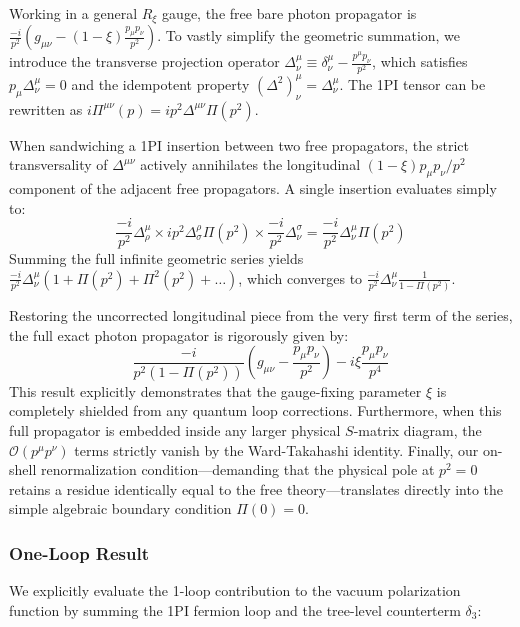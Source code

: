 Working in a general $R_\xi$ gauge, the free bare photon propagator is $\frac{-i}{p^2}\left(g_{\mu\nu} - (1-\xi)\frac{p_\mu p_\nu}{p^2}\right)$. To vastly simplify the geometric summation, we introduce the transverse projection operator $\Delta^\mu_\nu \equiv \delta^\mu_\nu - \frac{p^\mu p_\nu}{p^2}$, which satisfies $p_\mu \Delta^\mu_\nu = 0$ and the idempotent property $(\Delta^2)^\mu_\nu = \Delta^\mu_\nu$. The 1PI tensor can be rewritten as $i\Pi^{\mu\nu}(p) = i p^2 \Delta^{\mu\nu} \Pi(p^2)$.

When sandwiching a 1PI insertion between two free propagators, the strict transversality of $\Delta^{\mu\nu}$ actively annihilates the longitudinal $(1-\xi)p_\mu p_\nu/p^2$ component of the adjacent free propagators. A single insertion evaluates simply to:
\[
    \frac{-i}{p^2} \Delta^\mu_\rho \times i p^2 \Delta^\rho_\sigma \Pi(p^2) \times \frac{-i}{p^2} \Delta^\sigma_\nu = \frac{-i}{p^2} \Delta^\mu_\nu \Pi(p^2)
\]
Summing the full infinite geometric series yields $\frac{-i}{p^2} \Delta^\mu_\nu (1 + \Pi(p^2) + \Pi^2(p^2) + \dots)$, which converges to $\frac{-i}{p^2} \Delta^\mu_\nu \frac{1}{1 - \Pi(p^2)}$.

Restoring the uncorrected longitudinal piece from the very first term of the series, the full exact photon propagator is rigorously given by:
\[
    \frac{-i}{p^2 \left( 1 - \Pi(p^2) \right)} \left( g_{\mu\nu} - \frac{p_\mu p_\nu}{p^2} \right) - i\xi \frac{p_\mu p_\nu}{p^4}
\]
This result explicitly demonstrates that the gauge-fixing parameter $\xi$ is completely shielded from any quantum loop corrections. Furthermore, when this full propagator is embedded inside any larger physical $S$-matrix diagram, the $\mathcal{O}(p^\mu p^\nu)$ terms strictly vanish by the Ward-Takahashi identity. Finally, our on-shell renormalization condition—demanding that the physical pole at $p^2=0$ retains a residue identically equal to the free theory—translates directly into the simple algebraic boundary condition $\Pi(0) = 0$.

\subsubsection{One-Loop Result}

We explicitly evaluate the 1-loop contribution to the vacuum polarization function by summing the 1PI fermion loop and the tree-level counterterm $\delta_3$:


